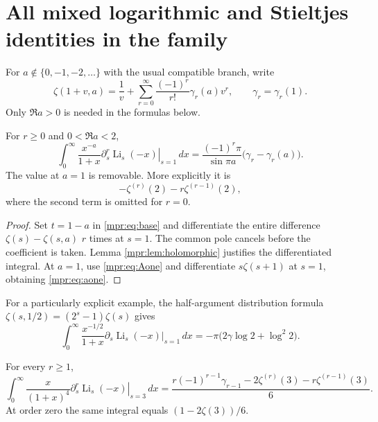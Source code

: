 \section{All mixed logarithmic and Stieltjes identities in the family}
\label{mpr:sec:jets}

For $a\notin\{0,-1,-2,\ldots\}$ with the usual compatible branch,
write
\[
 \zeta(1+v,a)=\frac1v+
       \sum_{r=0}^\infty\frac{(-1)^r}{r!}\gamma_r(a)v^r,
 \qquad \gamma_r=\gamma_r(1).
\]
Only $\Re a>0$ is needed in the formulas below.

\begin{corollary}
\label{mpr:cor:stieltjes}
For $r\ge0$ and $0<\Re a<2$,
\begin{equation}\label{mpr:eq:generalizedstieltjes}
 \int_0^\infty\frac{x^{-a}}{1+x}
   \left.\partial_s^r\operatorname{Li}_s(-x)\right|_{s=1}\,dx
  =\frac{(-1)^r\pi}{\sin\pi a}
                     \bigl(\gamma_r-\gamma_r(a)\bigr).
\end{equation}
The value at $a=1$ is removable.  More explicitly it is
\begin{equation}\label{mpr:eq:aone}
 -\zeta^{(r)}(2)-r\zeta^{(r-1)}(2),
\end{equation}
where the second term is omitted for $r=0$.
\end{corollary}

\begin{proof}
Set $t=1-a$ in \eqref{mpr:eq:base} and differentiate the entire
difference $\zeta(s)-\zeta(s,a)$ $r$ times at $s=1$.
The common pole cancels before the coefficient is taken.  Lemma
\ref{mpr:lem:holomorphic} justifies the differentiated integral.
At $a=1$, use \eqref{mpr:eq:Aone} and differentiate $s\zeta(s+1)$ at
$s=1$, obtaining \eqref{mpr:eq:aone}.
\end{proof}

For a particularly explicit example, the half-argument distribution
formula $\zeta(s,1/2)=(2^s-1)\zeta(s)$ gives
\begin{equation}\label{mpr:eq:halfexample}
 \int_0^\infty\frac{x^{-1/2}}{1+x}
   \left.\partial_s\operatorname{Li}_s(-x)\right|_{s=1}\,dx
 =-\pi\bigl(2\gamma\log2+\log^2 2\bigr).
\end{equation}

\begin{corollary}
\label{mpr:cor:quarticstieltjes}
For every $r\ge1$,
\begin{equation}\label{mpr:eq:quarticstieltjes}
 \boxed{\displaystyle
 \int_0^\infty\frac{x}{(1+x)^4}
    \left.\partial_s^r\operatorname{Li}_s(-x)\right|_{s=3}\,dx
 =\frac{r(-1)^{r-1}\gamma_{r-1}
       -2\zeta^{(r)}(3)-r\zeta^{(r-1)}(3)}6.}
\end{equation}
At order zero the same integral equals $(1-2\zeta(3))/6$.
\end{corollary}

